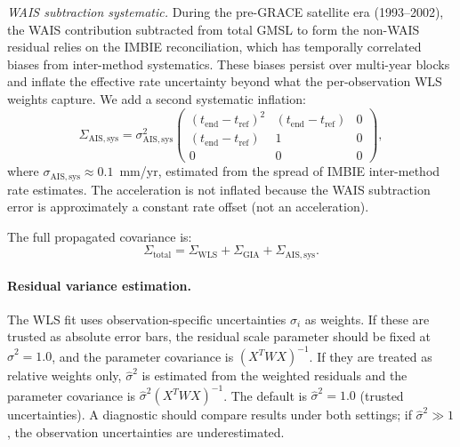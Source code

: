 \documentclass[11pt]{article}
\newcommand{\tend}{t_{\mathrm{end}}}
\begin{document}
\textit{WAIS subtraction systematic.}  During the pre-GRACE satellite era (1993--2002), the WAIS contribution subtracted from total GMSL to form the non-WAIS residual relies on the IMBIE reconciliation, which has temporally correlated biases from inter-method systematics.  These biases persist over multi-year blocks and inflate the effective rate uncertainty beyond what the per-observation WLS weights capture.  We add a second systematic inflation:
\begin{equation}
  \Sigma_{\mathrm{AIS,sys}} = \sigma_{\mathrm{AIS,sys}}^2 \begin{pmatrix} (\tend - t_{\mathrm{ref}})^2 & (\tend - t_{\mathrm{ref}}) & 0 \\ (\tend - t_{\mathrm{ref}}) & 1 & 0 \\ 0 & 0 & 0 \end{pmatrix},
  \label{eq:ais_sys_inflation}
\end{equation}
where $\sigma_{\mathrm{AIS,sys}} \approx 0.1$~mm/yr, estimated from the spread of IMBIE inter-method rate estimates.  The acceleration is not inflated because the WAIS subtraction error is approximately a constant rate offset (not an acceleration).

The full propagated covariance is:
\begin{equation}
  \Sigma_{\mathrm{total}} = \Sigma_{\mathrm{WLS}} + \Sigma_{\mathrm{GIA}} + \Sigma_{\mathrm{AIS,sys}}.
  \label{eq:total_covariance}
\end{equation}

\paragraph{Residual variance estimation.}  The WLS fit uses observation-specific uncertainties $\sigma_i$ as weights.  If these are trusted as absolute error bars, the residual scale parameter should be fixed at $\hat\sigma^2 = 1.0$, and the parameter covariance is $(X^T W X)^{-1}$.  If they are treated as relative weights only, $\hat\sigma^2$ is estimated from the weighted residuals and the parameter covariance is $\hat\sigma^2 (X^T W X)^{-1}$.  The default is $\hat\sigma^2 = 1.0$ (trusted uncertainties).  A diagnostic should compare results under both settings; if $\hat{\sigma}^2 \gg 1$, the observation uncertainties are underestimated.
\end{document}
